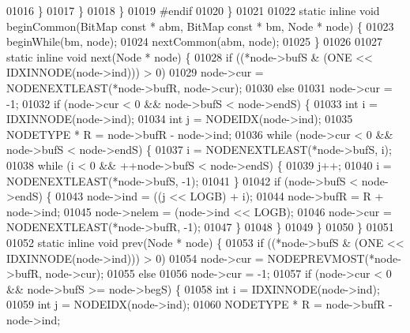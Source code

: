 \begin{DoxyCode}
01016                         \}
01017                 \}
01018         \}
01019 \textcolor{preprocessor}{#endif}
01020 \}
01021 
01022 \textcolor{keyword}{static} \textcolor{keyword}{inline} \textcolor{keywordtype}{void} beginCommon(BitMap \textcolor{keyword}{const} * abm, BitMap \textcolor{keyword}{const} * bm, Node * node) \{
01023         beginWhile(bm, node);
01024         nextCommon(abm, node);
01025 \}
01026 
01027 \textcolor{keyword}{static} \textcolor{keyword}{inline} \textcolor{keywordtype}{void} next(Node * node) \{
01028         \textcolor{keywordflow}{if} ((*node->bufS & (ONE << IDXINNODE(node->ind))) > 0)
01029                 node->cur = NODENEXTLEAST(*node->bufR, node->cur);
01030         \textcolor{keywordflow}{else}
01031                 node->cur = -1;
01032         \textcolor{keywordflow}{if} (node->cur < 0 && node->bufS < node->endS) \{
01033                 \textcolor{keywordtype}{int} i = IDXINNODE(node->ind);
01034                 \textcolor{keywordtype}{int} j = NODEIDX(node->ind);
01035                 NODETYPE * R = node->bufR - node->ind;
01036                 \textcolor{keywordflow}{while} (node->cur < 0 && node->bufS < node->endS) \{
01037                         i = NODENEXTLEAST(*node->bufS, i);
01038                         \textcolor{keywordflow}{while} (i < 0 && ++node->bufS < node->endS) \{
01039                                 j++;
01040                                 i = NODENEXTLEAST(*node->bufS, -1);
01041                         \}
01042                         \textcolor{keywordflow}{if} (node->bufS < node->endS) \{
01043                                 node->ind = ((j << LOGB) + i);
01044                                 node->bufR = R + node->ind;
01045                                 node->nelem = (node->ind << LOGB);
01046                                 node->cur = NODENEXTLEAST(*node->bufR, -1);
01047                         \}
01048                 \}
01049         \}
01050 \}
01051 
01052 \textcolor{keyword}{static} \textcolor{keyword}{inline} \textcolor{keywordtype}{void} prev(Node * node) \{
01053         \textcolor{keywordflow}{if} ((*node->bufS & (ONE << IDXINNODE(node->ind))) > 0)
01054                 node->cur = NODEPREVMOST(*node->bufR, node->cur);
01055         \textcolor{keywordflow}{else}
01056                 node->cur = -1;
01057         \textcolor{keywordflow}{if} (node->cur < 0 && node->bufS >= node->begS) \{
01058                 \textcolor{keywordtype}{int} i = IDXINNODE(node->ind);
01059                 \textcolor{keywordtype}{int} j = NODEIDX(node->ind);
01060                 NODETYPE * R = node->bufR - node->ind;

\end{DoxyCode}
